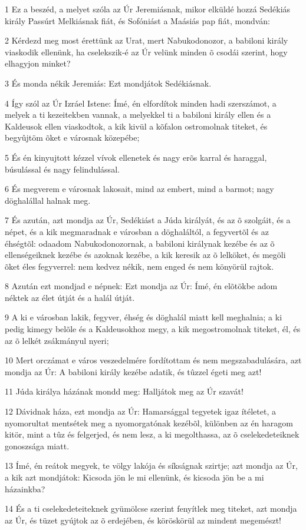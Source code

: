 \par 1 Ez a beszéd, a melyet szóla az Úr Jeremiásnak, mikor elküldé hozzá Sedékiás király Passúrt Melkiásnak fiát, és Sofóniást a Maásiás pap fiát, mondván:
\par 2 Kérdezd meg most érettünk az Urat, mert Nabukodonozor, a babiloni király viaskodik ellenünk, ha cselekszik-é az Úr velünk minden õ csodái szerint, hogy elhagyjon minket?
\par 3 És monda nékik Jeremiás: Ezt mondjátok Sedékiásnak.
\par 4 Így szól az Úr Izráel Istene: Ímé, én elfordítok minden hadi szerszámot, a melyek a ti kezeitekben vannak, a melyekkel ti a babiloni király ellen és a Kaldeusok ellen viaskodtok, a kik kivül a kõfalon ostromolnak titeket, és begyûjtöm õket e városnak közepébe;
\par 5 És én kinyujtott kézzel vívok ellenetek és nagy erõs karral és haraggal, búsulással és nagy felindulással.
\par 6 És megverem e városnak lakosait, mind az embert, mind a barmot; nagy döghalállal halnak meg.
\par 7 És azután, azt mondja az Úr, Sedékiást a Júda királyát, és az õ szolgáit, és a népet, és a kik megmaradnak e városban a döghaláltól, a fegyvertõl és az éhségtõl: odaadom Nabukodonozornak, a babiloni királynak kezébe és az õ ellenségeiknek kezébe és azoknak kezébe, a kik keresik az õ lelköket, és megöli õket éles fegyverrel: nem kedvez nékik, nem enged és nem könyörül rajtok.
\par 8 Azután ezt mondjad e népnek: Ezt mondja az Úr: Ímé, én elõtökbe adom néktek az élet útját és a halál útját.
\par 9 A ki e városban lakik, fegyver, éhség és döghalál miatt kell meghalnia; a ki pedig kimegy belõle és a Kaldeusokhoz megy, a kik megostromolnak titeket, él, és az õ lelkét zsákmányul nyeri;
\par 10 Mert orczámat e város veszedelmére fordítottam és nem megszabadulására, azt mondja az Úr: A babiloni király kezébe adatik, és tûzzel égeti meg azt!
\par 11 Júda királya házának mondd meg: Halljátok meg az Úr szavát!
\par 12 Dávidnak háza, ezt mondja az Úr: Hamarsággal tegyetek igaz ítéletet, a nyomorultat mentsétek meg a nyomorgatónak kezébõl, különben az én haragom kitör, mint a tûz és felgerjed, és nem lesz, a ki megolthassa, az õ cselekedeteiknek gonoszsága miatt.
\par 13 Ímé, én reátok megyek, te völgy lakója és síkságnak szirtje; azt mondja az Úr, a kik azt mondjátok: Kicsoda jön le mi ellenünk, és kicsoda jön be a mi házainkba?
\par 14 És a ti cselekedeteiteknek gyümölcse szerint fenyítlek meg titeket, azt mondja az Úr, és tüzet gyújtok az õ erdejében, és köröskörül az mindent megemészt!

